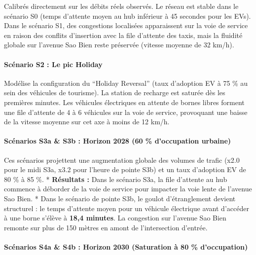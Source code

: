 \documentclass[11pt, a4paper]{article}
\begin{document}
Calibrés directement sur les débits réels observés. Le réseau est stable
dans le scénario S0 (temps d'attente moyen au hub inférieur à 45
secondes pour les EVs). Dans le scénario S1, des congestions localisées
apparaissent sur la voie de service en raison des conflits d'insertion
avec la file d'attente des taxis, mais la fluidité globale sur l'avenue
Sao Bien reste préservée (vitesse moyenne de 32 km/h).

\paragraph{Scénario S2 : Le pic
Holiday}\label{scuxe9nario-s2-le-pic-holiday}

Modélise la configuration du ``Holiday Reversal'' (taux d'adoption EV à
75 \% au sein des véhicules de tourisme). La station de recharge est
saturée dès les premières minutes. Les véhicules électriques en attente
de bornes libres forment une file d'attente de 4 à 6 véhicules sur la
voie de service, provoquant une baisse de la vitesse moyenne sur cet axe
à moins de 12 km/h.

\paragraph{Scénarios S3a \& S3b : Horizon 2028 (60 \% d'occupation
urbaine)}\label{scuxe9narios-s3a-s3b-horizon-2028-60-doccupation-urbaine}

Ces scénarios projettent une augmentation globale des volumes de trafic
(x2.0 pour le midi S3a, x3.2 pour l'heure de pointe S3b) et un taux
d'adoption EV de 80 \% à 85 \%. * \textbf{Résultats :} Dans le scénario
S3a, la file d'attente au hub commence à déborder de la voie de service
pour impacter la voie lente de l'avenue Sao Bien. * Dans le scénario de
pointe S3b, le goulot d'étranglement devient structurel : le temps
d'attente moyen pour un véhicule électrique avant d'accéder à une borne
s'élève à \textbf{18,4 minutes}. La congestion sur l'avenue Sao Bien
remonte sur plus de 150 mètres en amont de l'intersection d'entrée.

\paragraph{Scénarios S4a \& S4b : Horizon 2030 (Saturation à 80 \%
d'occupation)}\label{scuxe9narios-s4a-s4b-horizon-2030-saturation-uxe0-80-doccupation}
\end{document}

